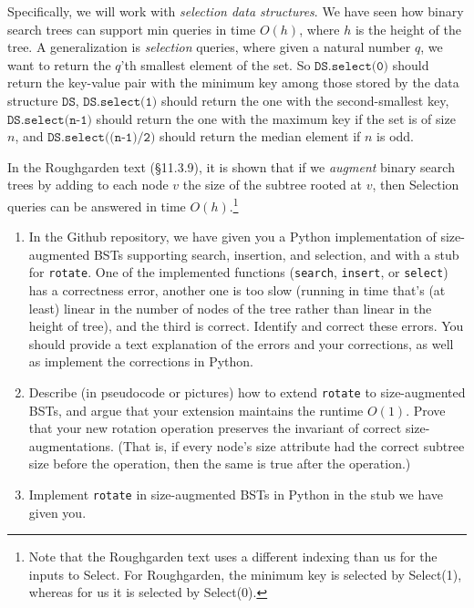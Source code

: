 \documentclass[11pt]{article}
\begin{document}
\begin{enumerate}
    Specifically, we will work with {\em selection data structures}.
    We have seen how binary search trees can support min queries in time $O(h)$, where $h$ is the height of the tree.  A generalization is {\em selection} queries, where given a natural number $q$, we want to return the $q$'th smallest element of the set.  So $\texttt{DS.select(0)}$ should return the key-value pair with the minimum key among those stored by the data structure $\texttt{DS}$, $\texttt{DS.select(1)}$ should return the one with the second-smallest key, $\texttt{DS.select(n-1)}$ should return the one with the maximum key if the set is of size $n$, and $\texttt{DS.select((n-1)/2)}$ should return the median element if $n$ is odd.
    
    In the Roughgarden text (\S11.3.9), it is shown that if we {\em augment} binary search trees by adding to each node $v$ the size of the subtree rooted at $v$, then Selection queries can be answered in time $O(h)$.\footnote{Note that the Roughgarden text uses a different indexing than us for the inputs to Select. For Roughgarden, the minimum key is selected by Select(1), whereas for us it is selected by Select(0).}
    
    \begin{enumerate}
        \item In the Github repository, we have given you a Python implementation of size-augmented BSTs supporting search, insertion, and selection, and with a stub for \texttt{rotate}. One of the implemented functions (\texttt{search}, \texttt{insert}, or \texttt{select}) has a correctness error, another one is too slow (running in time that's (at least) linear in the number of nodes of the tree rather than linear in the height of tree), and the third is correct. 
        Identify and correct these errors. You should provide a text explanation of the errors and your corrections, as well as implement the corrections in Python.
        
        \item Describe (in pseudocode or pictures) how to extend \texttt{rotate} to size-augmented BSTs, and argue that your extension maintains the runtime $O(1)$. Prove that your new rotation operation preserves the invariant of correct size-augmentations. (That is, if every node's size attribute had the correct subtree size before the operation, then the same is true after the operation.)
        
        \item Implement \texttt{rotate} in size-augmented BSTs in Python in the stub we have given you.
    

\end{enumerate}
\end{enumerate}
\end{document}
